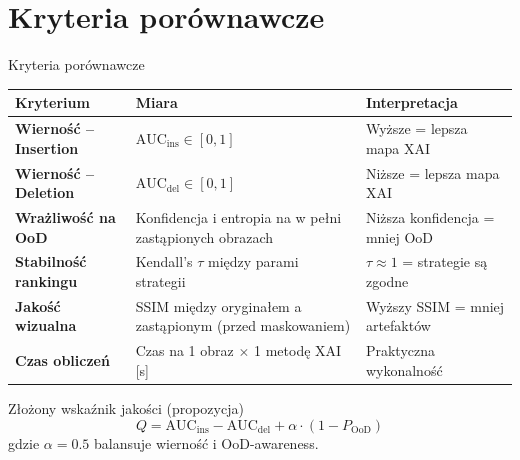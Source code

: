 \documentclass[aspectratio=169, 12pt]{beamer}
\begin{document}
\section{Kryteria porównawcze}

\begin{frame}{Kryteria porównawcze}
  \renewcommand{\arraystretch}{1.35}
  \small
  \begin{tabular}{>{\bfseries}p{3.6cm}
                  >{\raggedright\arraybackslash}p{4.5cm}
                  >{\raggedright\arraybackslash}p{3.4cm}}
    \toprule
    \textbf{Kryterium} & \textbf{Miara} & \textbf{Interpretacja} \\
    \midrule
    \rowcolor{lightgray}
    Wierność – Insertion &
      $\text{AUC}_\text{ins} \in [0,1]$ &
      Wyższe = lepsza mapa XAI \\

    Wierność – Deletion &
      $\text{AUC}_\text{del} \in [0,1]$ &
      Niższe = lepsza mapa XAI \\

    \rowcolor{lightgray}
    Wrażliwość na OoD &
      Konfidencja i entropia na w pełni zastąpionych obrazach &
      Niższa konfidencja = mniej OoD \\

    Stabilność rankingu &
      Kendall's $\tau$ między parami strategii &
      $\tau \approx 1$ = strategie są zgodne \\

    \rowcolor{lightgray}
    Jakość wizualna &
      SSIM między oryginałem a zastąpionym (przed maskowaniem) &
      Wyższy SSIM = mniej artefaktów \\

    Czas obliczeń &
      Czas na 1 obraz $\times$ 1 metodę XAI [s] &
      Praktyczna wykonalność \\
    \bottomrule
  \end{tabular}

  \vspace{8pt}
  \begin{block}{Złożony wskaźnik jakości (propozycja)}
    \[ Q = \text{AUC}_\text{ins} - \text{AUC}_\text{del} + \alpha \cdot (1 - P_\text{OoD}) \]
    gdzie $\alpha=0.5$ balansuje wierność i OoD-awareness.
  \end{block}
\end{frame}

\end{document}

